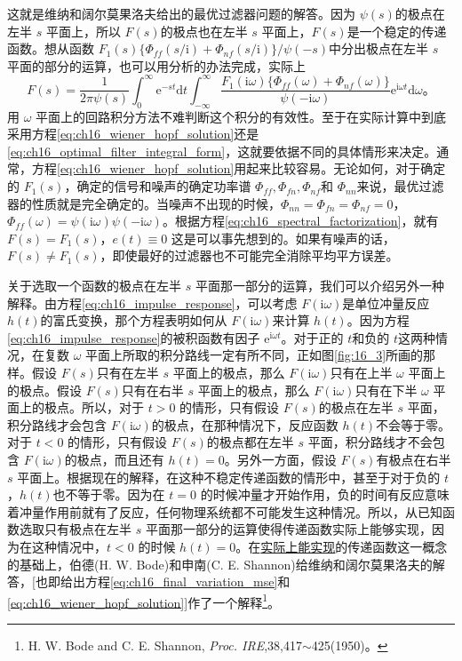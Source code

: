 这就是维纳和阔尔莫果洛夫给出的最优过滤器问题的解答。因为 $\psi(s)$的极点在左半 $s$ 平面上，所以 $F(s)$的极点也在左半 $s$ 平面上，$F(s)$是一个稳定的传递函数。想从函数 $F_1(s)\{\Phi_{ff}(s/\mathrm{i})+\Phi_{nf}(s/\mathrm{i})\}/\psi(-s)$中分出极点在左半 $s$ 平面的部分的运算，也可以用分析的办法完成，实际上
\begin{equation}
F(s)=\frac{1}{2\pi\psi(s)}\int_{0}^{\infty}\mathrm{e}^{-st}\mathrm{d}t\int_{-\infty}^{\infty}\frac{F_1(\mathrm{i}\omega)\bigl\{\Phi_{ff}(\omega)+\Phi_{nf}(\omega)\bigr\}}{\psi(-\mathrm{i}\omega)}\mathrm{e}^{\mathrm{i}\omega t}\mathrm{d}\omega。
\label{eq:ch16_optimal_filter_integral_form}
\end{equation}
用 $\omega$ 平面上的回路积分方法不难判断这个积分的有效性。至于在实际计算中到底采用方程\eqref{eq:ch16_wiener_hopf_solution}还是\eqref{eq:ch16_optimal_filter_integral_form}，这就要依据不同的具体情形来决定。通常，方程\eqref{eq:ch16_wiener_hopf_solution}用起来比较容易。无论如何，对于确定的 $F_1(s)$，确定的信号和噪声的确定功率谱 $\Phi_{ff},\Phi_{fn},\Phi_{nf}$和 $\Phi_{nn}$来说，最优过滤器的性质就是完全确定的。当噪声不出现的时候，$\Phi_{nn}=\Phi_{fn}=\Phi_{nf}=0$，$\Phi_{ff}(\omega)=\psi(\mathrm{i}\omega)\psi(-\mathrm{i}\omega)$。根据方程\eqref{eq:ch16_spectral_factorization}，就有 $F(s)=F_1(s)$，$e(t)\equiv0$ 这是可以事先想到的。如果有噪声的话，$F(s)\neq F_1(s)$，即使最好的过滤器也不可能完全消除平均平方误差。

关于选取一个函数的极点在左半 $s$ 平面那一部分的运算，我们可以介绍另外一种解释。由方程\eqref{eq:ch16_impulse_response}，可以考虑 $F(\mathrm{i}\omega)$是单位冲量反应 $h(t)$的富氏变换，那个方程表明如何从 $F(\mathrm{i}\omega)$来计算 $h(t)$。因为方程\eqref{eq:ch16_impulse_response}的被积函数有因子 $\mathrm{e}^{\mathrm{i}\omega t}$。对于正的 $t$和负的 $t$这两种情况，在复数 $\omega$ 平面上所取的积分路线一定有所不同，正如图\ref{fig:16_3}所画的那样。假设 $F(s)$只有在左半 $s$ 平面上的极点，那么 $F(\mathrm{i}\omega)$只有在上半 $\omega$ 平面上的极点。假设 $F(s)$只有在右半 $s$ 平面上的极点，那么 $F(\mathrm{i}\omega)$只有在下半 $\omega$ 平面上的极点。所以，对于 $t>0$ 的情形，只有假设 $F(s)$的极点在左半 $s$ 平面，积分路线才会包含 $F(\mathrm{i}\omega)$的极点，在那种情况下，反应函数 $h(t)$不会等于零。对于 $t<0$ 的情形，只有假设 $F(s)$的极点都在左半 $s$ 平面，积分路线才不会包含 $F(\mathrm{i}\omega)$的极点，而且还有 $h(t)=0$。另外一方面，假设 $F(s)$有极点在右半 $s$ 平面上。根据现在的解释，在这种不稳定传递函数的情形中，甚至于对于负的 $t$，$h(t)$也不等于零。因为在 $t=0$ 的时候冲量才开始作用，负的时间有反应意味着冲量作用前就有了反应，任何物理系统都不可能发生这种情况。所以，从已知函数选取只有极点在左半 $s$ 平面那一部分的运算使得传递函数实际上能够实现，因为在这种情况中，$t<0$ 的时候 $h(t)=0$。在\underline{实际上能实现}的传递函数这一概念的基础上，伯德(H. W. Bode)和申南(C. E. Shannon)给维纳和阔尔莫果洛夫的解答，[也即给出方程\eqref{eq:ch16_final_variation_mse}和\eqref{eq:ch16_wiener_hopf_solution}]作了一个解释\footnote{H. W. Bode and C. E. Shannon, \textit{Proc. IRE},38,417$\sim$425(1950)。}。

